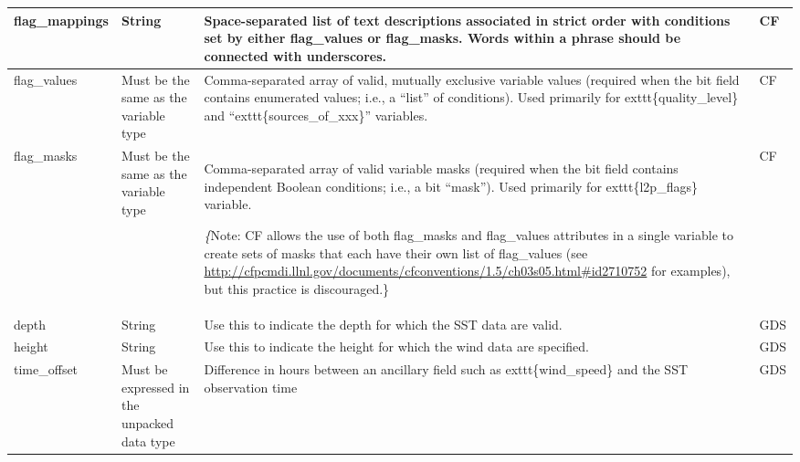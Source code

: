 \begin{longtable}{|p{}|p{}|p{}|p{}|}
\rowcolor{LightCyan} flag\_mappings & String & Space-separated list of text descriptions associated in strict order with conditions set by either flag\_values or flag\_masks. Words within a phrase should be connected with underscores. & CF \\ \hline

\rowcolor{LightCyan} flag\_values & Must be the same as
the variable type & Comma-separated array of valid, mutually exclusive variable values (required when the bit field contains enumerated values; i.e., a “list” of conditions). Used primarily for \hspace{0.5cm}exttt\{quality\_level\} and “\hspace{0.5cm}exttt\{sources\_of\_xxx\}” variables. & CF \\ \hline

\rowcolor{LightCyan} flag\_masks & Must be the same as the variable type & Comma-separated array of valid variable
masks (required when the bit field contains
independent Boolean conditions; i.e., a bit
“mask”). Used primarily for \hspace{0.5cm}exttt\{l2p\_flags\}
variable.

\emph\{Note: CF allows the use of both flag\_masks
and flag\_values attributes in a single variable
to create sets of masks that each have their
own list of flag\_values (see \url{http://cfpcmdi.llnl.gov/documents/cfconventions/1.5/ch03s05.html#id2710752} for
examples), but this practice is discouraged.\} & CF \\ \hline

\rowcolor{LightCyan} depth & String & Use this to indicate the depth for which the
SST data are valid. & GDS \\ \hline

\rowcolor{LightCyan} height & String & Use this to indicate the height for which the wind data are specified. & GDS \\ \hline

\rowcolor{LightCyan} time\_offset & Must be expressed in
the unpacked data
type & Difference in hours between an ancillary field such as \hspace{0.5cm}exttt\{wind\_speed\} and the SST observation time & GDS \\ \hline

\end{longtable}